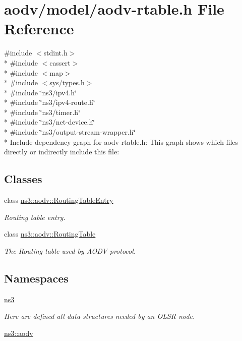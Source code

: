 \hypertarget{aodv-rtable_8h}{}\section{aodv/model/aodv-\/rtable.h File Reference}
\label{aodv-rtable_8h}
{\ttfamily \#include $<$stdint.\+h$>$}\\*
{\ttfamily \#include $<$cassert$>$}\\*
{\ttfamily \#include $<$map$>$}\\*
{\ttfamily \#include $<$sys/types.\+h$>$}\\*
{\ttfamily \#include \char`\"{}ns3/ipv4.\+h\char`\"{}}\\*
{\ttfamily \#include \char`\"{}ns3/ipv4-\/route.\+h\char`\"{}}\\*
{\ttfamily \#include \char`\"{}ns3/timer.\+h\char`\"{}}\\*
{\ttfamily \#include \char`\"{}ns3/net-\/device.\+h\char`\"{}}\\*
{\ttfamily \#include \char`\"{}ns3/output-\/stream-\/wrapper.\+h\char`\"{}}\\*
Include dependency graph for aodv-\/rtable.h\+:
This graph shows which files directly or indirectly include this file\+:
\subsection*{Classes}
\begin{DoxyCompactItemize}
\item 
class \hyperlink{classns3_1_1aodv_1_1RoutingTableEntry}{ns3\+::aodv\+::\+Routing\+Table\+Entry}
\begin{DoxyCompactList}\small\item\em Routing table entry. \end{DoxyCompactList}\item 
class \hyperlink{classns3_1_1aodv_1_1RoutingTable}{ns3\+::aodv\+::\+Routing\+Table}
\begin{DoxyCompactList}\small\item\em The Routing table used by A\+O\+DV protocol. \end{DoxyCompactList}\end{DoxyCompactItemize}
\subsection*{Namespaces}
\begin{DoxyCompactItemize}
\item 
 \hyperlink{namespacens3}{ns3}
\begin{DoxyCompactList}\small\item\em Here are defined all data structures needed by an O\+L\+SR node. \end{DoxyCompactList}\item 
 \hyperlink{namespacens3_1_1aodv}{ns3\+::aodv}
\end{DoxyCompactItemize}
